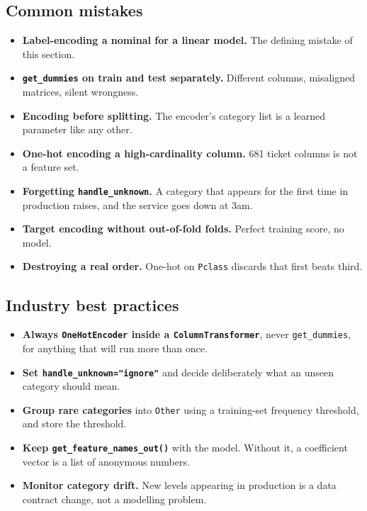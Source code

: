 \documentclass[11pt,a4paper]{article}
\begin{document}
\subsection*{Common mistakes}

\begin{itemize}\itemsep3pt
  \item \textbf{Label-encoding a nominal for a linear model.} The defining mistake of this
        section.
  \item \textbf{\lstinline|get_dummies| on train and test separately.} Different columns,
        misaligned matrices, silent wrongness.
  \item \textbf{Encoding before splitting.} The encoder's category list is a learned
        parameter like any other.
  \item \textbf{One-hot encoding a high-cardinality column.} 681 ticket columns is not a
        feature set.
  \item \textbf{Forgetting \lstinline|handle_unknown|.} A category that appears for the
        first time in production raises, and the service goes down at 3am.
  \item \textbf{Target encoding without out-of-fold folds.} Perfect training score, no model.
  \item \textbf{Destroying a real order.} One-hot on \texttt{Pclass} discards that first
        beats third.
\end{itemize}

\subsection*{Industry best practices}

\begin{itemize}\itemsep3pt
  \item \textbf{Always \lstinline|OneHotEncoder| inside a \lstinline|ColumnTransformer|},
        never \lstinline|get_dummies|, for anything that will run more than once.
  \item \textbf{Set \lstinline|handle_unknown="ignore"|} and decide deliberately what an
        unseen category should mean.
  \item \textbf{Group rare categories} into \texttt{Other} using a training-set frequency
        threshold, and store the threshold.
  \item \textbf{Keep \lstinline|get_feature_names_out()|} with the model. Without it, a
        coefficient vector is a list of anonymous numbers.
  \item \textbf{Monitor category drift.} New levels appearing in production is a data
        contract change, not a modelling problem.
\end{itemize}
\end{document}
